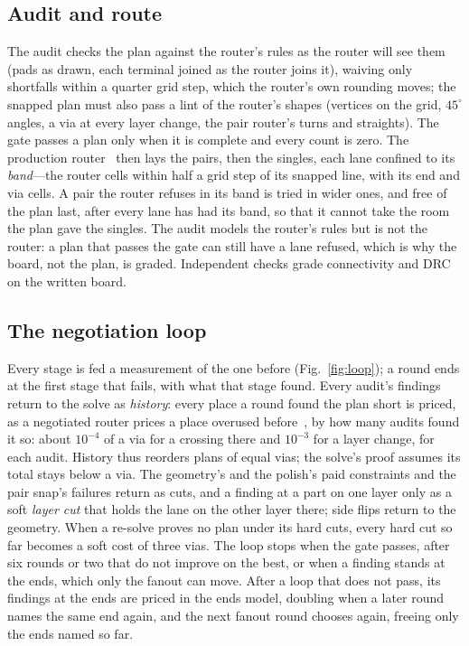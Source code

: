 \documentclass[journal]{IEEEtran}
\begin{document}
\subsection{Audit and route}
\label{sec:route}
The audit checks the plan against the router's rules as the router will see them (pads as drawn, each terminal joined as the router joins it), waiving only shortfalls within a quarter grid step, which the router's own rounding moves; the snapped plan must also pass a lint of the router's shapes (vertices on the grid, $45^\circ$ angles, a via at every layer change, the pair router's turns and straights). The gate passes a plan only when it is complete and every count is zero. The production router~\cite{krt} then lays the pairs, then the singles, each lane confined to its \emph{band}---the router cells within half a grid step of its snapped line, with its end and via cells. A pair the router refuses in its band is tried in wider ones, and free of the plan last, after every lane has had its band, so that it cannot take the room the plan gave the singles. The audit models the router's rules but is not the router: a plan that passes the gate can still have a lane refused, which is why the board, not the plan, is graded. Independent checks grade connectivity and DRC on the written board.

\subsection{The negotiation loop}
\label{sec:loop}
Every stage is fed a measurement of the one before (Fig.~\ref{fig:loop}); a round ends at the first stage that fails, with what that stage found. Every audit's findings return to the solve as \emph{history}: every place a round found the plan short is priced, as a negotiated router prices a place overused before~\cite{mcmurchie1995}, by how many audits found it so: about $10^{-4}$ of a via for a crossing there and $10^{-3}$ for a layer change, for each audit. History thus reorders plans of equal vias; the solve's proof assumes its total stays below a via. The geometry's and the polish's paid constraints and the pair snap's failures return as cuts, and a finding at a part on one layer only as a soft \emph{layer cut} that holds the lane on the other layer there; side flips return to the geometry. When a re-solve proves no plan under its hard cuts, every hard cut so far becomes a soft cost of three vias. The loop stops when the gate passes, after six rounds or two that do not improve on the best, or when a finding stands at the ends, which only the fanout can move. After a loop that does not pass, its findings at the ends are priced in the ends model, doubling when a later round names the same end again, and the next fanout round chooses again, freeing only the ends named so far.
\end{document}
